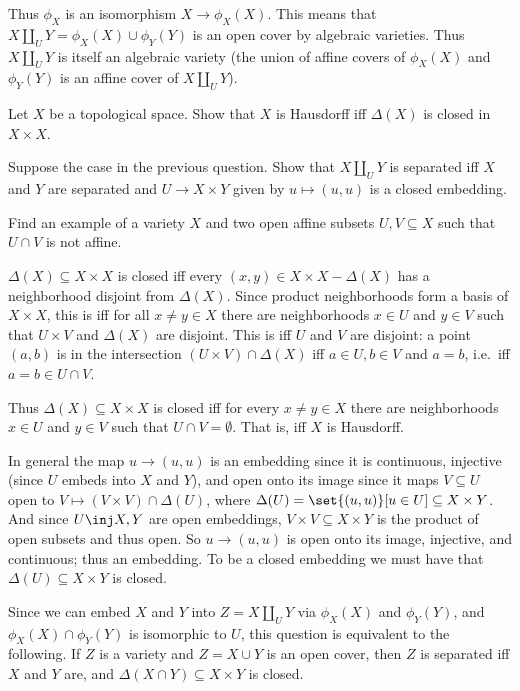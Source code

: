 Thus $\phi_X$ is an isomorphism $X\to\phi_X(X)$.
This means that $X\amalg_UY=\phi_X(X)\cup\phi_Y(Y)$ is an open cover by algebraic varieties.
Thus $X\amalg_UY$ is itself an algebraic variety (the union of affine covers of $\phi_X(X)$ and $\phi_Y(Y)$ is an affine cover of $X\amalg_UY$).

\bprob

    \benum
        \item Let $X$ be a topological space.
        Show that $X$ is Hausdorff iff $\Delta(X)$ is closed in $X\times X$.
        \item Suppose the case in the previous question.
        Show that $X\amalg_UY$ is separated iff $X$ and $Y$ are separated and $U\to X\times Y$ given by $u\mapsto(u,u)$ is a closed embedding.
        \item Find an example of a variety $X$ and two open affine subsets $U,V\subseteq X$ such that $U\cap V$ is not affine.
    \eenum

\eprob

\benum
    \item $\Delta(X)\subseteq X\times X$ is closed iff every $(x,y)\in X\times X-\Delta(X)$ has a neighborhood disjoint from $\Delta(X)$.
    Since product neighborhoods form a basis of $X\times X$, this is iff for all $x\neq y\in X$ there are neighborhoods $x\in U$ and $y\in V$ such that
    $U\times V$ and $\Delta(X)$ are disjoint.
    This is iff $U$ and $V$ are disjoint: a point $(a,b)$ is in the intersection $(U\times V)\cap\Delta(X)$ iff $a\in U,b\in V$ and $a=b$, i.e.\ iff $a=b\in U\cap V$.

    Thus $\Delta(X)\subseteq X\times X$ is closed iff for every $x\neq y\in X$ there are neighborhoods $x\in U$ and $y\in V$ such that $U\cap V=\emptyset$.
    That is, iff $X$ is Hausdorff.

    \item In general the map $u\to(u,u)$ is an embedding since it is continuous, injective (since $U$ embeds into $X$ and $Y$), and open onto its image since it maps $V\subseteq U$ open
    to $V\mapsto (V\times V)\cap\Delta(U)$, where $\Delta(U)=\set{(u,u)}[u\in U]\subseteq X\times Y$.
    And since $U\inj X,Y$ are open embeddings, $V\times V\subseteq X\times Y$ is the product of open subsets and thus open.
    So $u\to(u,u)$ is open onto its image, injective, and continuous; thus an embedding.
    To be a closed embedding we must have that $\Delta(U)\subseteq X\times Y$ is closed.

    Since we can embed $X$ and $Y$ into $Z=X\amalg_UY$ via $\phi_X(X)$ and $\phi_Y(Y)$, and $\phi_X(X)\cap\phi_Y(Y)$ is isomorphic to $U$, this question is equivalent to the following.
    If $Z$ is a variety and $Z=X\cup Y$ is an open cover, then $Z$ is separated iff $X$ and $Y$ are, and $\Delta(X\cap Y)\subseteq X\times Y$ is closed.

